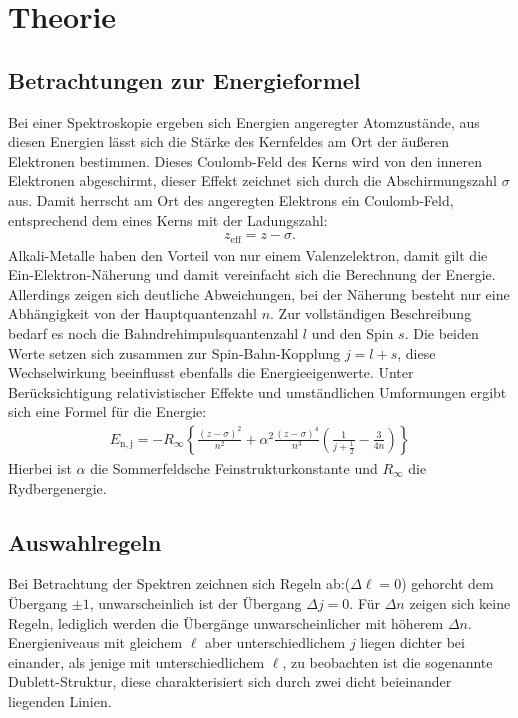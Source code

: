 \section{Theorie}
\label{sec:Theorie}
\subsection{Betrachtungen zur Energieformel}
Bei einer Spektroskopie ergeben sich Energien angeregter Atomzustände, aus diesen Energien lässt sich die Stärke
des Kernfeldes am Ort der äußeren Elektronen bestimmen. Dieses Coulomb-Feld des Kerns wird von den inneren Elektronen
abgeschirmt, dieser Effekt zeichnet sich durch die Abschirmungszahl $\sigma$ aus. Damit herrscht am Ort des angeregten Elektrons
ein Coulomb-Feld, entsprechend dem eines Kerns mit der Ladungszahl:
\begin{align}
  z_\mathrm{eff} = z-\sigma.
\end{align}
Alkali-Metalle haben den Vorteil von nur einem Valenzelektron, damit gilt die Ein-Elektron-Näherung und damit vereinfacht sich die Berechnung der Energie.
Allerdings zeigen sich deutliche Abweichungen, bei der Näherung besteht nur eine Abhängigkeit von der Hauptquantenzahl $n$.
Zur vollständigen Beschreibung bedarf es noch die Bahndrehimpulsquantenzahl $l$ und den Spin $s$. Die beiden Werte setzen sich zusammen
zur Spin-Bahn-Kopplung $j=l+s$, diese Wechselwirkung beeinflusst ebenfalls die Energieeigenwerte.
Unter Berücksichtigung relativistischer Effekte und umständlichen Umformungen ergibt sich eine Formel für die Energie:
\begin{align}
  E_\mathrm{n,j}=-R_\mathrm{\infty}\left\{\frac{(z-\sigma)^2}{n^2}+\alpha^2\frac{(z-\sigma)^4}{n^3}\left(\frac{1}{j+\frac{1}{2}}-\frac{3}{4n}\right)\right\}\label{eqn:sf}
\end{align}
Hierbei ist $\alpha$ die Sommerfeldsche Feinstrukturkonstante und $R_\mathrm{\infty}$ die Rydbergenergie.

\subsection{Auswahlregeln}
Bei Betrachtung der Spektren zeichnen sich Regeln ab:($\Delta\ell=0$) gehorcht dem Übergang $\pm 1$, unwarscheinlich ist der Übergang
$\Delta j=0$. Für $\Delta n$ zeigen sich keine Regeln, lediglich werden die Übergänge unwarscheinlicher mit höherem $\Delta n$.
Energieniveaus mit gleichem $\ell$ aber unterschiedlichem $j$ liegen dichter bei einander, als jenige mit unterschiedlichem $\ell$, zu beobachten
ist die sogenannte Dublett-Struktur, diese charakterisiert sich durch zwei dicht beieinander liegenden Linien.

